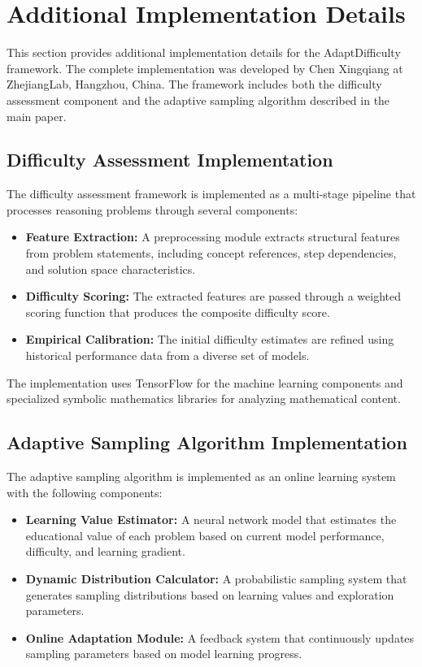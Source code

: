 
\section{Additional Implementation Details}
\label{appendix:impl}

This section provides additional implementation details for the AdaptDifficulty framework. The complete implementation was developed by Chen Xingqiang at ZhejiangLab, Hangzhou, China. The framework includes both the difficulty assessment component and the adaptive sampling algorithm described in the main paper.

\subsection{Difficulty Assessment Implementation}

The difficulty assessment framework is implemented as a multi-stage pipeline that processes reasoning problems through several components:

\begin{itemize}
    \item \textbf{Feature Extraction:} A preprocessing module extracts structural features from problem statements, including concept references, step dependencies, and solution space characteristics.
    \item \textbf{Difficulty Scoring:} The extracted features are passed through a weighted scoring function that produces the composite difficulty score.
    \item \textbf{Empirical Calibration:} The initial difficulty estimates are refined using historical performance data from a diverse set of models.
\end{itemize}

The implementation uses TensorFlow for the machine learning components and specialized symbolic mathematics libraries for analyzing mathematical content.

\subsection{Adaptive Sampling Algorithm Implementation}
The adaptive sampling algorithm is implemented as an online learning system with the following components:

\begin{itemize}
    \item \textbf{Learning Value Estimator:} A neural network model that estimates the educational value of each problem based on current model performance, difficulty, and learning gradient.
    \item \textbf{Dynamic Distribution Calculator:} A probabilistic sampling system that generates sampling distributions based on learning values and exploration parameters.
    \item \textbf{Online Adaptation Module:} A feedback system that continuously updates sampling parameters based on model learning progress.
\end{itemize}

